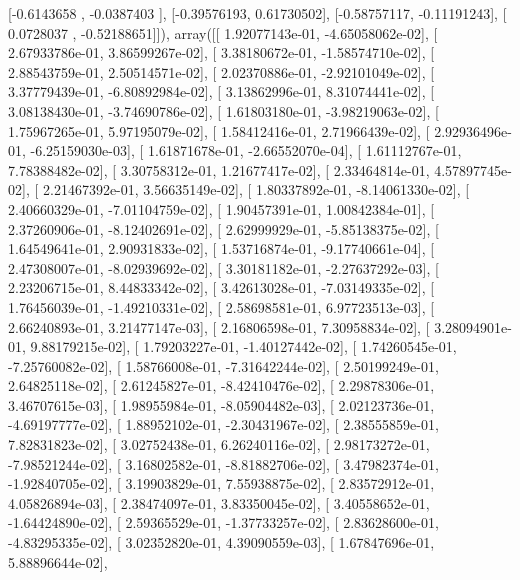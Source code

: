 \documentclass{article}
\begin{document}
       [-0.6143658 , -0.0387403 ],
       [-0.39576193,  0.61730502],
       [-0.58757117, -0.11191243],
       [ 0.0728037 , -0.52188651]]), array([[  1.92077143e-01,  -4.65058062e-02],
       [  2.67933786e-01,   3.86599267e-02],
       [  3.38180672e-01,  -1.58574710e-02],
       [  2.88543759e-01,   2.50514571e-02],
       [  2.02370886e-01,  -2.92101049e-02],
       [  3.37779439e-01,  -6.80892984e-02],
       [  3.13862996e-01,   8.31074441e-02],
       [  3.08138430e-01,  -3.74690786e-02],
       [  1.61803180e-01,  -3.98219063e-02],
       [  1.75967265e-01,   5.97195079e-02],
       [  1.58412416e-01,   2.71966439e-02],
       [  2.92936496e-01,  -6.25159030e-03],
       [  1.61871678e-01,  -2.66552070e-04],
       [  1.61112767e-01,   7.78388482e-02],
       [  3.30758312e-01,   1.21677417e-02],
       [  2.33464814e-01,   4.57897745e-02],
       [  2.21467392e-01,   3.56635149e-02],
       [  1.80337892e-01,  -8.14061330e-02],
       [  2.40660329e-01,  -7.01104759e-02],
       [  1.90457391e-01,   1.00842384e-01],
       [  2.37260906e-01,  -8.12402691e-02],
       [  2.62999929e-01,  -5.85138375e-02],
       [  1.64549641e-01,   2.90931833e-02],
       [  1.53716874e-01,  -9.17740661e-04],
       [  2.47308007e-01,  -8.02939692e-02],
       [  3.30181182e-01,  -2.27637292e-03],
       [  2.23206715e-01,   8.44833342e-02],
       [  3.42613028e-01,  -7.03149335e-02],
       [  1.76456039e-01,  -1.49210331e-02],
       [  2.58698581e-01,   6.97723513e-03],
       [  2.66240893e-01,   3.21477147e-03],
       [  2.16806598e-01,   7.30958834e-02],
       [  3.28094901e-01,   9.88179215e-02],
       [  1.79203227e-01,  -1.40127442e-02],
       [  1.74260545e-01,  -7.25760082e-02],
       [  1.58766008e-01,  -7.31642244e-02],
       [  2.50199249e-01,   2.64825118e-02],
       [  2.61245827e-01,  -8.42410476e-02],
       [  2.29878306e-01,   3.46707615e-03],
       [  1.98955984e-01,  -8.05904482e-03],
       [  2.02123736e-01,  -4.69197777e-02],
       [  1.88952102e-01,  -2.30431967e-02],
       [  2.38555859e-01,   7.82831823e-02],
       [  3.02752438e-01,   6.26240116e-02],
       [  2.98173272e-01,  -7.98521244e-02],
       [  3.16802582e-01,  -8.81882706e-02],
       [  3.47982374e-01,  -1.92840705e-02],
       [  3.19903829e-01,   7.55938875e-02],
       [  2.83572912e-01,   4.05826894e-03],
       [  2.38474097e-01,   3.83350045e-02],
       [  3.40558652e-01,  -1.64424890e-02],
       [  2.59365529e-01,  -1.37733257e-02],
       [  2.83628600e-01,  -4.83295335e-02],
       [  3.02352820e-01,   4.39090559e-03],
       [  1.67847696e-01,   5.88896644e-02],
\end{document}
